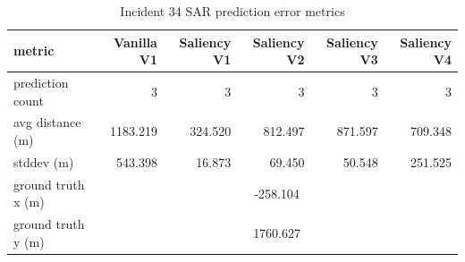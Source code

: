 \begin{table}[ht]
\centering
\caption{Incident 34 SAR prediction error metrics}
\label{tab:sar-incident-34}
\begin{tabular}{lrrrrr}
\hline
metric & Vanilla V1 & Saliency V1 & Saliency V2 & Saliency V3 & Saliency V4 \\
\hline
prediction count & 3 & 3 & 3 & 3 & 3 \\
avg distance (m) & 1183.219 & 324.520 & 812.497 & 871.597 & 709.348 \\
stddev (m) & 543.398 & 16.873 & 69.450 & 50.548 & 251.525 \\
ground truth x (m) & \multicolumn{5}{c}{-258.104} \\
ground truth y (m) & \multicolumn{5}{c}{1760.627} \\
\hline
\end{tabular}
\end{table}
